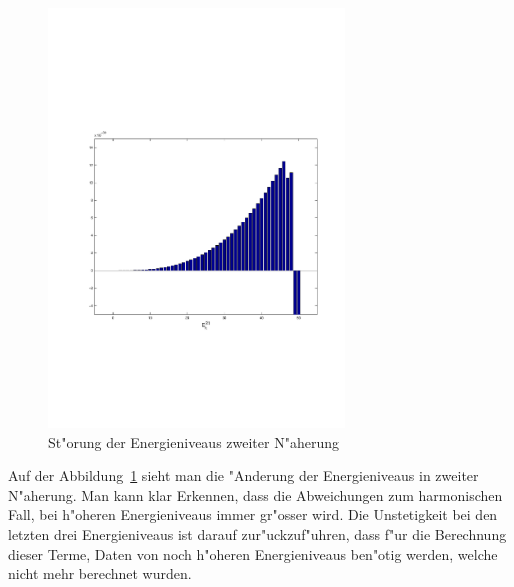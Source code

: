 \begin{refsection}
\begin{figure}[h]	%
\centering
\includegraphics[width=0.7\textwidth]{anharmonisch/images/x4/EK2.pdf}
\caption{St"orung der Energieniveaus zweiter N"aherung
\label{skript:x4_EK2}}
\end{figure}

Auf der Abbildung~\ref{skript:x4_EK2} sieht man die "Anderung der Energieniveaus in zweiter N"aherung. Man kann klar Erkennen, dass die Abweichungen zum harmonischen Fall, bei h"oheren Energieniveaus immer gr"osser wird. Die Unstetigkeit bei den letzten drei Energieniveaus ist darauf zur"uckzuf"uhren, dass f"ur die Berechnung dieser Terme, Daten von noch h"oheren Energieniveaus ben"otig werden, welche nicht mehr berechnet wurden.


\end{refsection}
